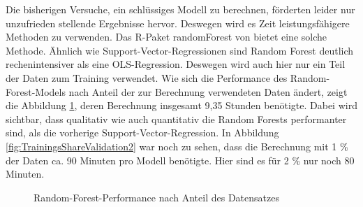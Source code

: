 \documentclass[a4paper,12pt]{thesis}
\begin{document}
Die bisherigen Versuche, ein schlüssiges Modell zu berechnen, förderten leider nur unzufrieden stellende Ergebnisse hervor. Deswegen wird es Zeit leistungsfähigere Methoden zu verwenden. Das R-Paket \glqq{}randomForest\grqq{}  von \cite{Liaw2002} bietet eine solche Methode. Ähnlich wie Support-Vector-Regressionen sind Random Forest deutlich rechenintensiver als eine OLS-Regression. Deswegen wird auch hier nur ein Teil der Daten zum Training verwendet. Wie sich die Performance des Random-Forest-Models nach Anteil der zur Berechnung verwendeten Daten ändert, zeigt die Abbildung \ref{fig:TrainingsShareValidation1}, deren Berechnung insgesamt 9,35 Stunden benötigte. Dabei wird sichtbar, dass qualitativ wie auch quantitativ die Random Forests performanter sind, als die vorherige Support-Vector-Regression. In Abbildung \ref{fig:TrainingsShareValidation2} war noch zu sehen, dass die Berechnung mit 1 \% der Daten ca. 90 Minuten pro Modell benötigte. Hier sind es für 2 \% nur noch 80 Minuten.

\begin{figure}%
	\centering
	\qquad
	\caption{Random-Forest-Performance nach Anteil des Datensatzes}%
	\label{fig:TrainingsShareValidation1}%
\end{figure}
\end{document}

